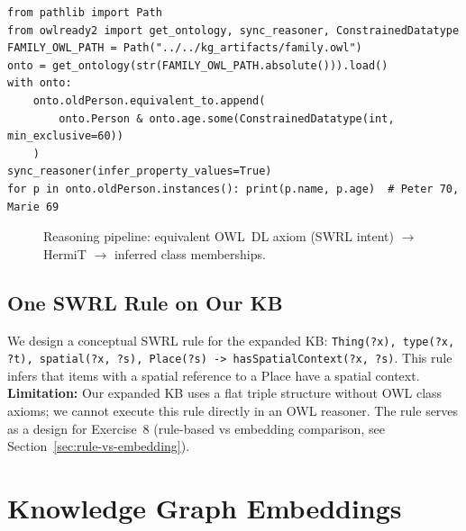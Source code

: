 \documentclass[11pt,a4paper]{article}
\begin{document}
\begin{lstlisting}[caption={\texttt{src/kge/phase3\_knowledge\_reasoning.ipynb} -- OWL DL equivalent SWRL (Phase 3)}]
from pathlib import Path
from owlready2 import get_ontology, sync_reasoner, ConstrainedDatatype
FAMILY_OWL_PATH = Path("../../kg_artifacts/family.owl")
onto = get_ontology(str(FAMILY_OWL_PATH.absolute())).load()
with onto:
    onto.oldPerson.equivalent_to.append(
        onto.Person & onto.age.some(ConstrainedDatatype(int, min_exclusive=60))
    )
sync_reasoner(infer_property_values=True)
for p in onto.oldPerson.instances(): print(p.name, p.age)  # Peter 70, Marie 69
\end{lstlisting}

\begin{figure}[ht]
\centering
{}
\caption{Reasoning pipeline: equivalent OWL~DL axiom (SWRL intent) $\rightarrow$ HermiT $\rightarrow$ inferred class memberships.}
\end{figure}

\subsection{One SWRL Rule on Our KB}

We design a conceptual SWRL rule for the expanded KB: \texttt{Thing(?x), type(?x, ?t), spatial(?x, ?s), Place(?s) -> hasSpatialContext(?x, ?s)}. This rule infers that items with a spatial reference to a Place have a spatial context. \textbf{Limitation:} Our expanded KB uses a flat triple structure without OWL class axioms; we cannot execute this rule directly in an OWL reasoner. The rule serves as a design for Exercise~8 (rule-based vs embedding comparison, see Section~\ref{sec:rule-vs-embedding}).

\section{Knowledge Graph Embeddings}
\end{document}
